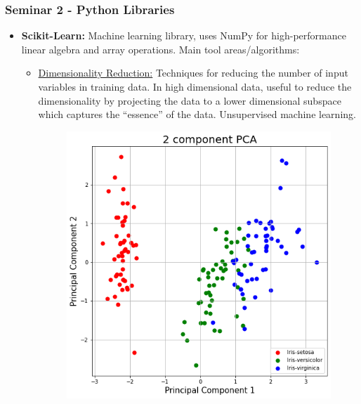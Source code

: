 \documentclass{beamer}
\begin{document}
\begin{frame}
\frametitle{Seminar 2 - Python Libraries}
\begin{itemize}
    \item \textbf{Scikit-Learn:}\newline
    Machine learning library, uses NumPy for high-performance linear algebra and array operations.
    Main tool areas/algorithms:\newline
    \begin{itemize}
        \item \underline{Dimensionality Reduction:}
        Techniques for reducing the number of input variables in training data.
        In high dimensional data, useful to reduce the dimensionality by projecting the data to a lower dimensional subspace which captures the “essence” of the data. Unsupervised machine learning.
         \begin{figure}
         \includegraphics[width=0.4\linewidth]{Seminar_2_images/Python/b py 5.png}
         \label{Example mean-shift clustering algorithm}
         \end{figure}
   \end{itemize}
\end{itemize}
\end{frame}
\end{document}
